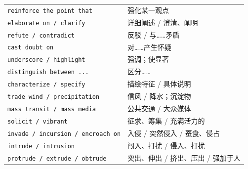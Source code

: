\documentclass[UTF8,zihao=-4]{ctexart}
\begin{document}
\begin{longtable}{>{\raggedright\arraybackslash}p{5.0cm} >{\raggedright\arraybackslash}p{9.5cm}}
\texttt{reinforce the point that} & 强化某一观点 \\
\texttt{elaborate on / clarify} & 详细阐述 / 澄清、阐明 \\
\texttt{refute / contradict} & 反驳 / 与……矛盾 \\
\texttt{cast doubt on} & 对……产生怀疑 \\
\texttt{underscore / highlight} & 强调；使显著 \\
\texttt{distinguish between ...} & 区分…… \\
\texttt{characterize / specify} & 描绘特征 / 具体说明 \\
\texttt{trade wind / precipitation} & 信风 / 降水；沉淀物 \\
\texttt{mass transit / mass media} & 公共交通 / 大众媒体 \\
\texttt{solicit / vibrant} & 征求、筹集 / 充满活力的 \\
\texttt{invade / incursion / encroach on} & 入侵 / 突然侵入 / 蚕食、侵占 \\
\texttt{intrude / intrusion} & 闯入、打扰 / 侵入、打扰 \\
\texttt{protrude / extrude / obtrude} & 突出、伸出 / 挤出、压出 / 强加于人 \\
\bottomrule
\end{longtable}
\end{document}
